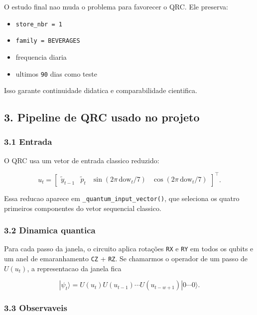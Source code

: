 \documentclass[12pt]{article}
\providecommand{\tightlist}{%
          \setlength{\itemsep}{0pt}\setlength{\parskip}{0pt}}
\begin{document}
O estudo final nao muda o problema para favorecer o QRC. Ele preserva:

\begin{itemize}
\tightlist
\item
  \texttt{store\_nbr\ =\ 1}
\item
  \texttt{family\ =\ BEVERAGES}
\item
  frequencia diaria
\item
  ultimos \texttt{90} dias como teste
\end{itemize}

Isso garante continuidade didatica e comparabilidade cientifica.

\subsection{3. Pipeline de QRC usado no projeto}\label{3-pipeline-de-qrc-usado-no-projeto}

\subsubsection{3.1 Entrada}\label{31-entrada}

O QRC usa um vetor de entrada classico reduzido:

\[
u_t =
\begin{bmatrix}
\widetilde{y}_{t-1} &
\widetilde{p}_t &
\sin(2\pi \, \mathrm{dow}_t / 7) &
\cos(2\pi \, \mathrm{dow}_t / 7)
\end{bmatrix}^\top.
\]

Essa reducao aparece em \texttt{\_quantum\_input\_vector()}, que seleciona os quatro primeiros componentes do vetor sequencial classico.

\subsubsection{3.2 Dinamica quantica}\label{32-dinamica-quantica}

Para cada passo da janela, o circuito aplica rotações \texttt{RX} e \texttt{RY} em todos os qubits e um anel de emaranhamento \texttt{CZ} + \texttt{RZ}. Se chamarmos o operador de um passo de \(U(u_t)\), a representacao da janela fica

\[
|\psi_t\rangle = U(u_t) U(u_{t-1}) \cdots U(u_{t-w+1}) |0 \cdots 0\rangle.
\]

\subsubsection{3.3 Observaveis}\label{33-observaveis}
\end{document}
